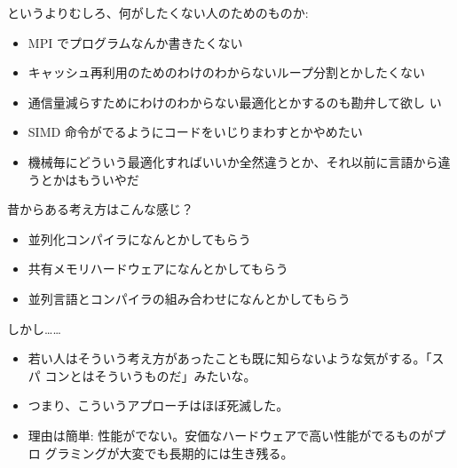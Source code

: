 \documentclass[12pt,dvipdfmx]{article}
\begin{document}


というよりむしろ、何がしたくない人のためのものか:

\begin{itemize}

\item MPI でプログラムなんか書きたくない

\item キャッシュ再利用のためのわけのわからないループ分割とかしたくない

\item 通信量減らすためにわけのわからない最適化とかするのも勘弁して欲し
い

\item SIMD 命令がでるようにコードをいじりまわすとかやめたい

\item 機械毎にどういう最適化すればいいか全然違うとか、それ以前に言語から違うとかはもういやだ

\end{itemize}


昔からある考え方はこんな感じ？

\begin{itemize}

\item 並列化コンパイラになんとかしてもらう

\item 共有メモリハードウェアになんとかしてもらう

\item 並列言語とコンパイラの組み合わせになんとかしてもらう

\end{itemize}

しかし……
\begin{itemize}

\item 若い人はそういう考え方があったことも既に知らないような気がする。「スパ
コンとはそういうものだ」みたいな。

\item つまり、こういうアプローチはほぼ死滅した。

\item 理由は簡単: 性能がでない。安価なハードウェアで高い性能がでるものがプロ
グラミングが大変でも長期的には生き残る。

\end{itemize}
\end{document}
